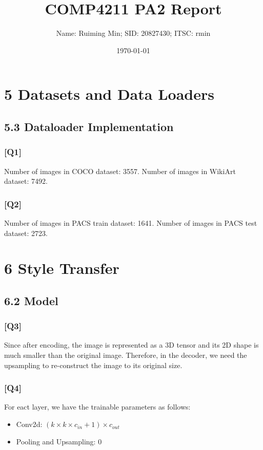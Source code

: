 \documentclass{article}
\title{COMP4211 PA2 Report}
\author{Name: Ruiming Min; SID: 20827430; ITSC: rmin}
\date{\today}
\begin{document}
    
\maketitle

\section*{5 Datasets and Data Loaders}

\subsection*{5.3 Dataloader Implementation}

\subsubsection*{[Q1]}
Number of images in COCO dataset: 3557.
Number of images in WikiArt dataset: 7492.

\subsubsection*{[Q2]}
Number of images in PACS train dataset: 1641.
Number of images in PACS test dataset: 2723.

\section*{6 Style Transfer}

\subsection*{6.2 Model}

\subsubsection*{[Q3]}
Since after encoding, the image is represented as a 3D tensor and its 2D shape is much smaller than the original image. 
Therefore, in the decoder, we need the upsampling to re-construct the image to its original size.

\subsubsection*{[Q4]}
For eact layer, we have the trainable parameters as follows:
\begin{itemize}
    \item Conv2d: $(k \times k \times c_{in} + 1) \times c_{out}$
    \item Pooling and Upsampling: 0
\end{itemize}
\end{document}
